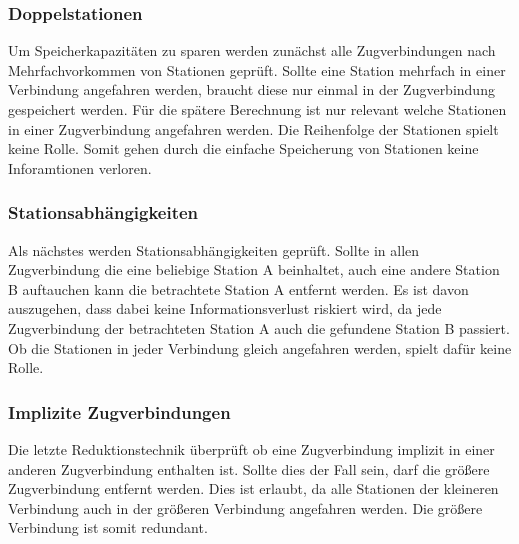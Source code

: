 \subsubsection{Doppelstationen}\label{subsubsec:doppelstationen}
Um Speicherkapazitäten zu sparen werden zunächst alle Zugverbindungen nach Mehrfachvorkommen von Stationen geprüft. Sollte eine Station mehrfach in einer Verbindung angefahren werden, braucht diese nur einmal in der Zugverbindung gespeichert werden. Für die spätere Berechnung ist nur relevant welche Stationen in einer Zugverbindung angefahren werden. Die Reihenfolge der Stationen spielt keine Rolle. Somit gehen durch die einfache Speicherung von Stationen keine Inforamtionen verloren.\\

\subsubsection{Stationsabhängigkeiten}
Als nächstes werden Stationsabhängigkeiten geprüft. Sollte in allen Zugverbindung die eine beliebige Station A beinhaltet, auch eine andere Station B auftauchen kann die betrachtete Station A entfernt werden. Es ist davon auszugehen, dass dabei keine Informationsverlust riskiert wird, da jede Zugverbindung der betrachteten Station A auch die gefundene Station B passiert. Ob die Stationen in jeder Verbindung gleich angefahren werden, spielt dafür keine Rolle.

\subsubsection{Implizite Zugverbindungen}
Die letzte Reduktionstechnik überprüft ob eine Zugverbindung implizit in einer anderen Zugverbindung enthalten ist. Sollte dies der Fall sein, darf die größere Zugverbindung entfernt werden. Dies ist erlaubt, da alle Stationen der kleineren Verbindung auch in der größeren Verbindung angefahren werden. Die größere Verbindung ist somit redundant.\\

